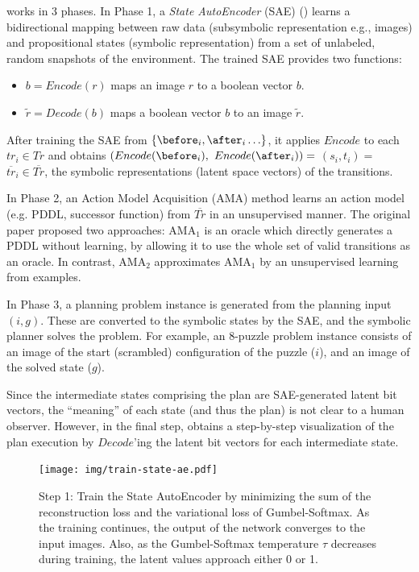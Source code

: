 \latentplanner works in 3 phases.
In Phase 1, a \emph{State AutoEncoder} (SAE) () learns a bidirectional mapping between raw data (subsymbolic representation e.g., images)
 and propositional states (symbolic representation) from a set of unlabeled, random snapshots of the environment.
The trained SAE provides two functions:
\begin{itemize} %
\setlength{\itemsep}{-0.3em}
\item $b=Encode(r)$ maps an image  $r$ to a boolean vector $b$.
\item $\tilde{r}=Decode(b)$ maps a boolean vector $b$ to an image $\tilde{r}$.
\end{itemize}
After training the SAE from $\braces{\before_i, \after_i\ldots}$,
it applies $Encode$ to each $tr_i \in Tr$ and obtains $(Encode(\before_i),$ $Encode(\after_i))=$ $(s_i,t_i)=$ $\overline{tr}_i\in \overline{Tr}$,
the symbolic representations (latent space vectors) of the transitions.

In Phase 2, an Action Model Acquisition (AMA) method learns an action model (e.g. PDDL, successor function) from $\overline{Tr}$ in an unsupervised manner.
The original paper proposed two approaches: AMA$_1$ is an oracle which directly generates a PDDL without learning,
by allowing it to use the whole set of valid transitions as an oracle.
In contrast, AMA$_2$ approximates AMA$_1$ by an unsupervised learning from examples.

In Phase 3, a planning problem instance is generated from the planning input $(i,g)$.
These are converted to the symbolic states by the SAE, and the symbolic planner solves the problem.
For example, an 8-puzzle problem instance consists of an image of the start (scrambled) configuration of the puzzle ($i$), and an image of the solved state ($g$).

Since the intermediate states comprising the plan are SAE-generated latent bit vectors, the ``meaning'' of each state (and thus the plan) is not clear to a human observer.
However, in the final step, \latentplanner obtains a step-by-step visualization of the plan execution
by $Decode$'ing the latent bit vectors for each intermediate state.

\begin{figure}[tb]
 \texttt{[image: img/train-state-ae.pdf]}
 \caption{Step 1:
Train the State AutoEncoder by
 minimizing the sum of the reconstruction loss and the variational loss of Gumbel-Softmax.
As the training continues, the output of the network converges to the input images.
Also, as the Gumbel-Softmax temperature $\tau$ decreases during training,
the latent values approach either 0 or 1.}
 \label{sae}
\end{figure}

